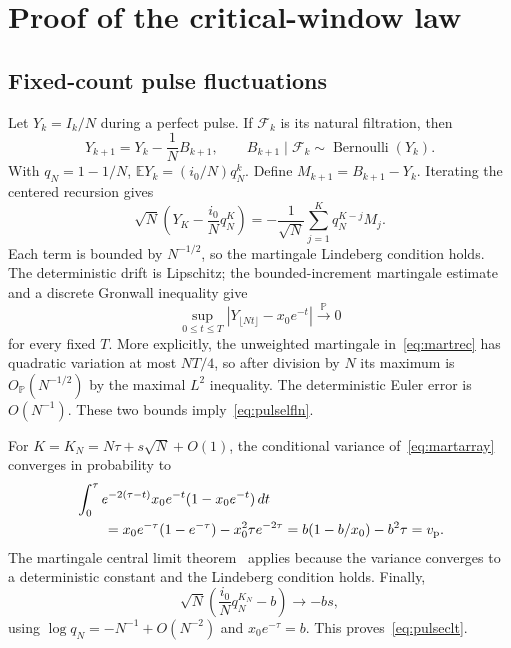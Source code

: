\documentclass[11pt]{article}
\theoremstyle{remark}\newtheorem{remark}[theorem]{Remark}
\newcommand{\E}{\mathbb E}\newcommand{\Prob}{\mathbb P}
\begin{document}
\appendix
\section{Proof of the critical-window law}
\label{app:proof}
\subsection{Fixed-count pulse fluctuations}
Let $Y_k=I_k/N$ during a perfect pulse. If $\mathcal F_k$ is its natural filtration, then
\begin{equation}
 Y_{k+1}=Y_k-\frac1N B_{k+1},\qquad
 B_{k+1}\mid\mathcal F_k\sim\operatorname{Bernoulli}(Y_k).
 \label{eq:martrec}
\end{equation}
With $q_N=1-1/N$, $\E Y_k=(i_0/N)q_N^k$. Define $M_{k+1}=B_{k+1}-Y_k$. Iterating the centered recursion gives
\begin{equation}
 \sqrt N\left(Y_K-\frac{i_0}{N}q_N^K\right)
 =-\frac1{\sqrt N}\sum_{j=1}^{K}q_N^{K-j}M_j.
 \label{eq:martarray}
\end{equation}
Each term is bounded by $N^{-1/2}$, so the martingale Lindeberg condition holds. The deterministic drift is Lipschitz; the bounded-increment martingale estimate and a discrete Gronwall inequality give
\begin{equation}
 \sup_{0\le t\le T}|Y_{\lfloor Nt\rfloor}-x_0e^{-t}|\xrightarrow{\Prob}0
 \label{eq:pulselfln}
\end{equation}
for every fixed $T$. More explicitly, the unweighted martingale in~\eqref{eq:martrec} has quadratic variation at most $NT/4$, so after division by $N$ its maximum is $O_{\Prob}(N^{-1/2})$ by the maximal $L^2$ inequality. The deterministic Euler error is $O(N^{-1})$. These two bounds imply~\eqref{eq:pulselfln}.

For $K=K_N=N\tau+s\sqrt N+O(1)$, the conditional variance of~\eqref{eq:martarray} converges in probability to
\begin{align}
 &\int_0^\tau e^{-2(\tau-t)}x_0e^{-t}(1-x_0e^{-t})\,dt\nonumber\\
 &\qquad=x_0e^{-\tau}(1-e^{-\tau})-x_0^2\tau e^{-2\tau}
 =b(1-b/x_0)-b^2\tau=v_{\rm p}.
 \label{eq:martvar}
\end{align}
The martingale central limit theorem~\citep[Theorem 4]{lalley2014} applies because the variance converges to a deterministic constant and the Lindeberg condition holds. Finally,
\begin{equation}
 \sqrt N\left(\frac{i_0}{N}q_N^{K_N}-b\right)\longrightarrow-bs,
\end{equation}
using $\log q_N=-N^{-1}+O(N^{-2})$ and $x_0e^{-\tau}=b$. This proves~\eqref{eq:pulseclt}.
\end{document}
